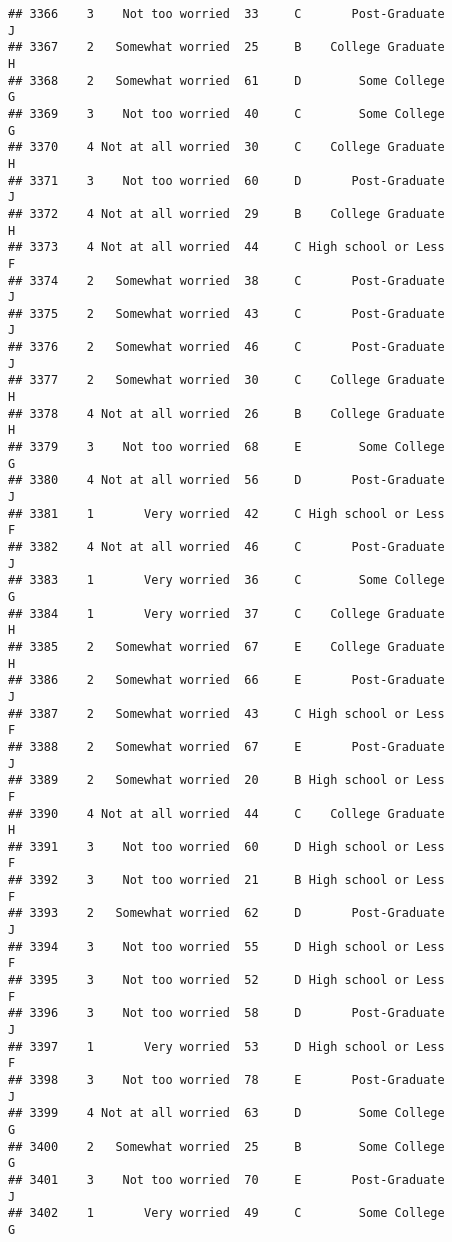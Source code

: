 \documentclass[
]{article}
\begin{document}
\begin{verbatim}
## 3366    3    Not too worried  33     C       Post-Graduate         J
## 3367    2   Somewhat worried  25     B    College Graduate         H
## 3368    2   Somewhat worried  61     D        Some College         G
## 3369    3    Not too worried  40     C        Some College         G
## 3370    4 Not at all worried  30     C    College Graduate         H
## 3371    3    Not too worried  60     D       Post-Graduate         J
## 3372    4 Not at all worried  29     B    College Graduate         H
## 3373    4 Not at all worried  44     C High school or Less         F
## 3374    2   Somewhat worried  38     C       Post-Graduate         J
## 3375    2   Somewhat worried  43     C       Post-Graduate         J
## 3376    2   Somewhat worried  46     C       Post-Graduate         J
## 3377    2   Somewhat worried  30     C    College Graduate         H
## 3378    4 Not at all worried  26     B    College Graduate         H
## 3379    3    Not too worried  68     E        Some College         G
## 3380    4 Not at all worried  56     D       Post-Graduate         J
## 3381    1       Very worried  42     C High school or Less         F
## 3382    4 Not at all worried  46     C       Post-Graduate         J
## 3383    1       Very worried  36     C        Some College         G
## 3384    1       Very worried  37     C    College Graduate         H
## 3385    2   Somewhat worried  67     E    College Graduate         H
## 3386    2   Somewhat worried  66     E       Post-Graduate         J
## 3387    2   Somewhat worried  43     C High school or Less         F
## 3388    2   Somewhat worried  67     E       Post-Graduate         J
## 3389    2   Somewhat worried  20     B High school or Less         F
## 3390    4 Not at all worried  44     C    College Graduate         H
## 3391    3    Not too worried  60     D High school or Less         F
## 3392    3    Not too worried  21     B High school or Less         F
## 3393    2   Somewhat worried  62     D       Post-Graduate         J
## 3394    3    Not too worried  55     D High school or Less         F
## 3395    3    Not too worried  52     D High school or Less         F
## 3396    3    Not too worried  58     D       Post-Graduate         J
## 3397    1       Very worried  53     D High school or Less         F
## 3398    3    Not too worried  78     E       Post-Graduate         J
## 3399    4 Not at all worried  63     D        Some College         G
## 3400    2   Somewhat worried  25     B        Some College         G
## 3401    3    Not too worried  70     E       Post-Graduate         J
## 3402    1       Very worried  49     C        Some College         G

\end{verbatim}
\end{document}
